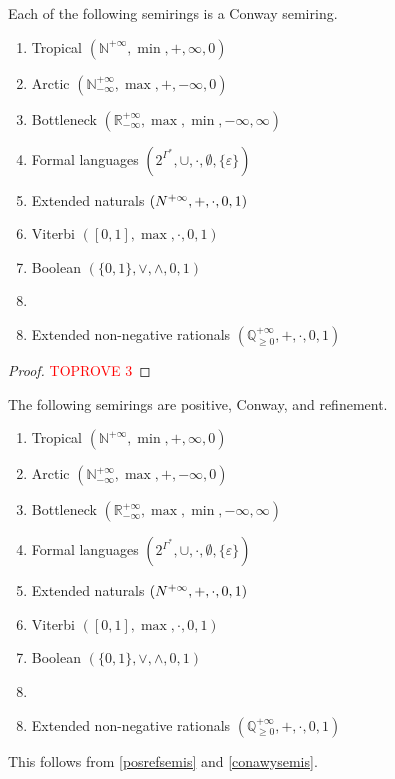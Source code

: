 \documentclass[a4paper,UKenglish,cleveref, autoref, thm-restate]{lipics-v2021}
\newcommand{\exN}{\mathbb{N}^{+\infty}}
\newcommand{\exQp}{\mathbb{Q}_{\geq0}^{+\infty}}
\theoremstyle{plain}\newtheoremrep{thm}{Theorem}[section]
\begin{document}
\begin{toappendix}
		\begin{lem}
			Each of the following semirings is a Conway semiring. \label{conawysemis}
			\begin{multicols}{2}
				\begin{enumerate}[nosep]
					\item Tropical $(\exN, \min, +, \infty, 0)$
					\item Arctic  $(\mathbb N^{+\infty}_{-\infty}, \max, +, -\infty, 0)$
					\item Bottleneck  $(\mathbb R^{+\infty}_{-\infty}, \max, \min, -\infty, \infty)$
					\item Formal languages  $(2^{\Gamma^*}, \cup, \cdot, \emptyset, \{\varepsilon\})$
					\item Extended naturals  $(\mathbb \exN, +, \cdot, 0, 1)$
					\item Viterbi  $([0,1], \max, \cdot, 0, 1)$
					\item Boolean  $(\{0,1\}, \lor, \land, 0, 1)$
					\item[]
				\end{enumerate}
			\end{multicols}
			\begin{enumerate}[nosep]
				\setcounter{enumi}{7}
				\item Extended non-negative rationals $(\exQp, +, \cdot, 0, 1)$
			\end{enumerate}
		\end{lem}
		\begin{proof}\textcolor{red}{TOPROVE 3}\end{proof}
	\end{toappendix}
	\begin{correp}
		The following semirings are positive, Conway, and refinement.
		\begin{multicols}{2}
			\begin{enumerate}[nosep]
				\item Tropical $(\exN, \min, +, \infty, 0)$
				\item Arctic  $(\mathbb N^{+\infty}_{-\infty}, \max, +, -\infty, 0)$
				\item Bottleneck  $(\mathbb R^{+\infty}_{-\infty}, \max, \min, -\infty, \infty)$
				\item Formal languages  $(2^{\Gamma^*}, \cup, \cdot, \emptyset, \{\varepsilon\})$
				\item Extended naturals  $(\mathbb \exN, +, \cdot, 0, 1)$
				\item Viterbi  $([0,1], \max, \cdot, 0, 1)$
				\item Boolean  $(\{0,1\}, \lor, \land, 0, 1)$
				\item[]
			\end{enumerate}
		\end{multicols}
		\begin{enumerate}[nosep]
			\setcounter{enumi}{7}
				\item Extended non-negative rationals $(\exQp, +, \cdot, 0, 1)$
		\end{enumerate}
	\end{correp}
	\begin{appendixproof}
		This follows from \cref{posrefsemis} and \cref{conawysemis}.
	\end{appendixproof}
	
\end{document}
